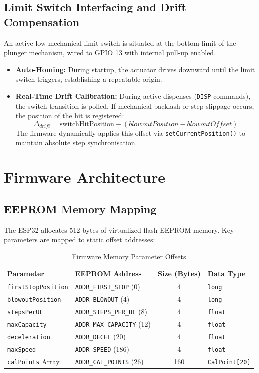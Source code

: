 \documentclass[11pt,a4paper]{article}
\begin{document}
\subsection{Limit Switch Interfacing and Drift Compensation}
An active-low mechanical limit switch is situated at the bottom limit of the plunger mechanism, wired to GPIO 13 with internal pull-up enabled.
\begin{itemize}
    \item \textbf{Auto-Homing:} During startup, the actuator drives downward until the limit switch triggers, establishing a repeatable origin.
    \item \textbf{Real-Time Drift Calibration:} During active dispenses (\texttt{DISP} commands), the switch transition is polled. If mechanical backlash or step-slippage occurs, the position of the hit is registered:
    \begin{equation}
        \Delta_{drift} = \text{switchHitPosition} - (blowoutPosition - blowoutOffset)
    \end{equation}
    The firmware dynamically applies this offset via \texttt{setCurrentPosition()} to maintain absolute step synchronisation.
\end{itemize}

\newpage
\section{Firmware Architecture}

\subsection{EEPROM Memory Mapping}
The ESP32 allocates 512 bytes of virtualized flash EEPROM memory. Key parameters are mapped to static offset addresses:

\begin{table}[h]
\centering
\begin{tabular}{llcl}
\toprule
\textbf{Parameter} & \textbf{EEPROM Address} & \textbf{Size (Bytes)} & \textbf{Data Type} \\
\midrule
\texttt{firstStopPosition} & \texttt{ADDR\_FIRST\_STOP} (0) & 4 & \texttt{long} \\
\texttt{blowoutPosition} & \texttt{ADDR\_BLOWOUT} (4) & 4 & \texttt{long} \\
\texttt{stepsPerUL} & \texttt{ADDR\_STEPS\_PER\_UL} (8) & 4 & \texttt{float} \\
\texttt{maxCapacity} & \texttt{ADDR\_MAX\_CAPACITY} (12) & 4 & \texttt{float} \\
\texttt{deceleration} & \texttt{ADDR\_DECEL} (20) & 4 & \texttt{float} \\
\texttt{maxSpeed} & \texttt{ADDR\_SPEED} (186) & 4 & \texttt{float} \\
\texttt{calPoints} Array & \texttt{ADDR\_CAL\_POINTS} (26) & 160 & \texttt{CalPoint[20]} \\
\bottomrule
\end{tabular}
\caption{Firmware Memory Parameter Offsets}
\label{tab:eeprom_map}
\end{table}
\end{document}
